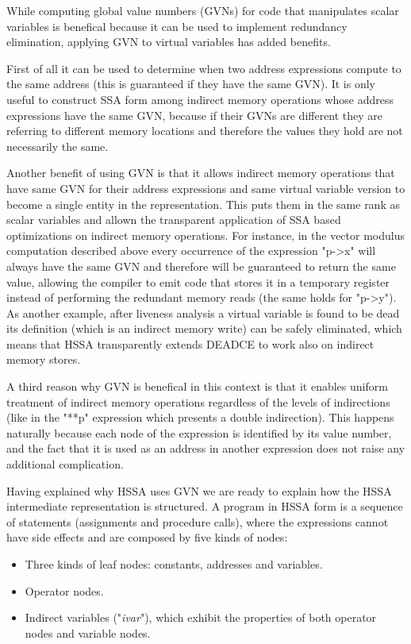 While computing global value numbers (GVNs) for code that manipulates scalar variables is benefical because it can be used to implement redundancy elimination, applying GVN to virtual variables has added benefits.

First of all it can be used to determine when two address expressions compute to the same address (this is guaranteed if they have the same GVN).
It is only useful to construct SSA form among indirect memory operations whose address expressions have the same GVN, because if their GVNs are different they are referring to different memory locations and therefore the values they hold are not necessarily the same.

Another benefit of using GVN is that it allows indirect memory operations that have same GVN for their address expressions and same virtual variable version to become a single entity in the representation. This puts them in the same rank as scalar variables and allown the transparent application of SSA based optimizations on indirect memory operations.
For instance, in the vector modulus computation described above every occurrence of the expression "p-\textgreater x" will always have the same GVN and therefore will be guaranteed to return the same value, allowing the compiler to emit code that stores it in a temporary register instead of performing the redundant memory reads (the same holds for "p-\textgreater y").
As another example, after liveness analysis a virtual variable is found to be dead its definition (which is an indirect memory write) can be safely eliminated, which means that HSSA transparently extends DEADCE to work also on indirect memory stores.

A third reason why GVN is benefical in this context is that it enables uniform treatment of indirect memory operations regardless of the levels of indirections (like in the "**p" expression which presents a double indirection).
This happens naturally because each node of the expression is identified by its value number, and the fact that it is used as an address in another expression does not raise any additional complication.

Having explained why HSSA uses GVN we are ready to explain how the HSSA intermediate representation is structured.
A program in HSSA form is a sequence of statements (assignments and procedure calls), where the expressions cannot have side effects and are composed by five kinds of nodes:
\begin{itemize}
\item Three kinds of leaf nodes: constants, addresses and variables.
\item Operator nodes.
\item Indirect variables ("{\em ivar}"), which exhibit the properties of both operator nodes and variable nodes.
\end{itemize}

